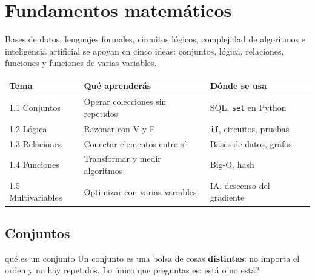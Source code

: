 \chapter{Fundamentos matem\'aticos}
\label{cap:fundamentos}

\begin{tmsistemas}
Bases de datos, lenguajes formales, circuitos l\'ogicos, complejidad de algoritmos e inteligencia artificial se apoyan en cinco ideas: conjuntos, l\'ogica, relaciones, funciones y funciones de varias variables.
\end{tmsistemas}

\begin{center}
\begin{tabular}{|p{3.6cm}|p{5.2cm}|p{4.2cm}|}
\hline
\rowcolor{tmAzulClaro}\textbf{Tema} & \textbf{Qu\'e aprender\'as} & \textbf{D\'onde se usa}\\ \hline
1.1 Conjuntos & Operar colecciones sin repetidos & SQL, \texttt{set} en Python\\ \hline
1.2 L\'ogica & Razonar con V y F & \texttt{if}, circuitos, pruebas\\ \hline
1.3 Relaciones & Conectar elementos entre s\'i & Bases de datos, grafos\\ \hline
1.4 Funciones & Transformar y medir algoritmos & Big-O, hash\\ \hline
1.5 Multivariables & Optimizar con varias variables & IA, descenso del gradiente\\ \hline
\end{tabular}
\end{center}

\section{Conjuntos}
\label{sec:1-1}

\begin{tmconcepto}{qu\'e es un conjunto}
Un conjunto es una bolsa de cosas \textbf{distintas}: no importa el orden y no hay repetidos. Lo \'unico que preguntas es: \textquestiondown est\'a o no est\'a?
\end{tmconcepto}


